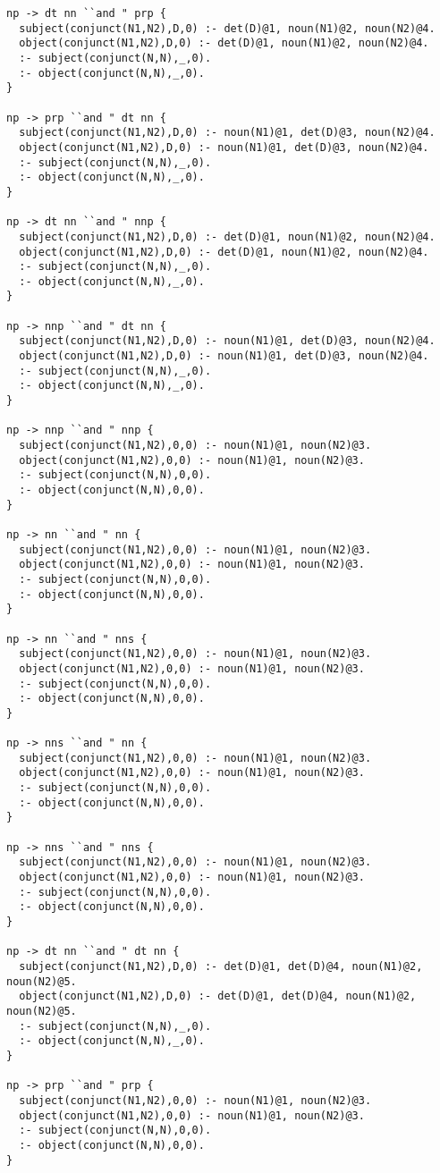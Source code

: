 \begin{lstlisting}
np -> dt nn ``and " prp {
  subject(conjunct(N1,N2),D,0) :- det(D)@1, noun(N1)@2, noun(N2)@4.
  object(conjunct(N1,N2),D,0) :- det(D)@1, noun(N1)@2, noun(N2)@4.
  :- subject(conjunct(N,N),_,0).
  :- object(conjunct(N,N),_,0).
}

np -> prp ``and " dt nn {
  subject(conjunct(N1,N2),D,0) :- noun(N1)@1, det(D)@3, noun(N2)@4.
  object(conjunct(N1,N2),D,0) :- noun(N1)@1, det(D)@3, noun(N2)@4.
  :- subject(conjunct(N,N),_,0).
  :- object(conjunct(N,N),_,0).
}

np -> dt nn ``and " nnp {
  subject(conjunct(N1,N2),D,0) :- det(D)@1, noun(N1)@2, noun(N2)@4.
  object(conjunct(N1,N2),D,0) :- det(D)@1, noun(N1)@2, noun(N2)@4.
  :- subject(conjunct(N,N),_,0).
  :- object(conjunct(N,N),_,0).
}

np -> nnp ``and " dt nn {
  subject(conjunct(N1,N2),D,0) :- noun(N1)@1, det(D)@3, noun(N2)@4.
  object(conjunct(N1,N2),D,0) :- noun(N1)@1, det(D)@3, noun(N2)@4.
  :- subject(conjunct(N,N),_,0).
  :- object(conjunct(N,N),_,0).
}

np -> nnp ``and " nnp {
  subject(conjunct(N1,N2),0,0) :- noun(N1)@1, noun(N2)@3.
  object(conjunct(N1,N2),0,0) :- noun(N1)@1, noun(N2)@3.
  :- subject(conjunct(N,N),0,0).
  :- object(conjunct(N,N),0,0).
}

np -> nn ``and " nn {
  subject(conjunct(N1,N2),0,0) :- noun(N1)@1, noun(N2)@3.
  object(conjunct(N1,N2),0,0) :- noun(N1)@1, noun(N2)@3.
  :- subject(conjunct(N,N),0,0).
  :- object(conjunct(N,N),0,0).
}

np -> nn ``and " nns {
  subject(conjunct(N1,N2),0,0) :- noun(N1)@1, noun(N2)@3.
  object(conjunct(N1,N2),0,0) :- noun(N1)@1, noun(N2)@3.
  :- subject(conjunct(N,N),0,0).
  :- object(conjunct(N,N),0,0).
}

np -> nns ``and " nn {
  subject(conjunct(N1,N2),0,0) :- noun(N1)@1, noun(N2)@3.
  object(conjunct(N1,N2),0,0) :- noun(N1)@1, noun(N2)@3.
  :- subject(conjunct(N,N),0,0).
  :- object(conjunct(N,N),0,0).
}

np -> nns ``and " nns {
  subject(conjunct(N1,N2),0,0) :- noun(N1)@1, noun(N2)@3.
  object(conjunct(N1,N2),0,0) :- noun(N1)@1, noun(N2)@3.
  :- subject(conjunct(N,N),0,0).
  :- object(conjunct(N,N),0,0).
}

np -> dt nn ``and " dt nn {
  subject(conjunct(N1,N2),D,0) :- det(D)@1, det(D)@4, noun(N1)@2, noun(N2)@5.
  object(conjunct(N1,N2),D,0) :- det(D)@1, det(D)@4, noun(N1)@2, noun(N2)@5.
  :- subject(conjunct(N,N),_,0).
  :- object(conjunct(N,N),_,0).
}

np -> prp ``and " prp {
  subject(conjunct(N1,N2),0,0) :- noun(N1)@1, noun(N2)@3.
  object(conjunct(N1,N2),0,0) :- noun(N1)@1, noun(N2)@3.
  :- subject(conjunct(N,N),0,0).
  :- object(conjunct(N,N),0,0).
}


\end{lstlisting}
